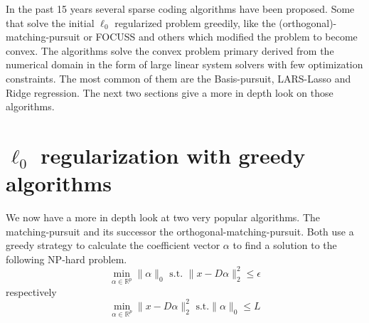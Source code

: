 In the past 15 years several sparse coding algorithms have been proposed. Some
that solve the initial $\ell_0$ regularized problem greedily, like
the (orthogonal)-matching-pursuit or FOCUSS and others which modified the
problem to become convex. The algorithms solve the convex problem  primary
derived from the numerical domain in the form of large linear system solvers
with few optimization constraints. The most common of them are the
Basis-pursuit, LARS-Lasso and Ridge regression. The next two sections give a
more in depth look on those algorithms. 




\section{$\ell_0$ regularization with greedy algorithms}
We now have a more in depth look at two very popular algorithms. 
The matching-pursuit and its successor the orthogonal-matching-pursuit.
Both use a greedy strategy to calculate the coefficient vector $\alpha$ to find
a solution to the following NP-hard problem.
\begin{equation}
\min_{\alpha\in\mathbb{R}^{p}}   \lVert \alpha \rVert_{0}   \textrm{ s.t. }
\lVert x - D\alpha \rVert^{2}_{2} \leq \epsilon
\end{equation}
respectively
\begin{equation}
\min_{\alpha\in\mathbb{R}^{p}}  \lVert x - D\alpha \rVert^{2}_{2} \textrm{ s.t.
} \lVert \alpha \rVert_{0} \leq L
\end{equation}

